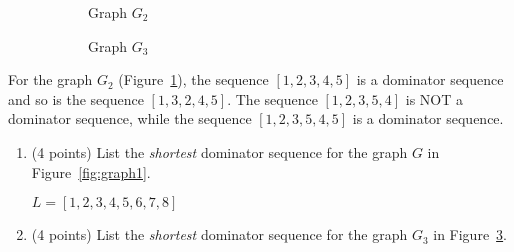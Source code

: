\documentclass[12pt]{article}
\begin{document}
\begin{enumerate}
  \begin{figure}[t]
    \centering
    \begin{subfigure}[b]{0.50\linewidth}
      \centering
    \caption{Graph $G_2$}
    \label{fig:graph2}
    \end{subfigure}
    \begin{subfigure}[b]{0.40\linewidth}
      \centering
    \caption{Graph $G_3$}
    \label{fig:graph3}
    \end{subfigure}
  \caption{}
  \end{figure}

  For the graph $G_2$ (Figure~\ref{fig:graph2}), the sequence $[1,2,3,4,5]$
  is a dominator sequence and so is the sequence $[1,3,2,4,5]$.
  The sequence $[1, 2,3,5,4]$ is NOT a dominator sequence, while
  the sequence $[1,2,3,5,4,5]$ is a dominator sequence. 
  
  \begin{enumerate} 
    \item (4 points) List the \emph{shortest} dominator sequence for the
    graph $G$ in Figure~\ref{fig:graph1}.
    \begin{mdframed}
      $L = [1,2,3,4,5,6,7,8]$
    \end{mdframed}

    \item (4 points) List the \emph{shortest} dominator sequence for the
    graph $G_3$ in Figure~\ref{fig:graph3}.
    \begin{mdframed}
      

\end{mdframed}
\end{enumerate}
\end{enumerate}
\end{document}
